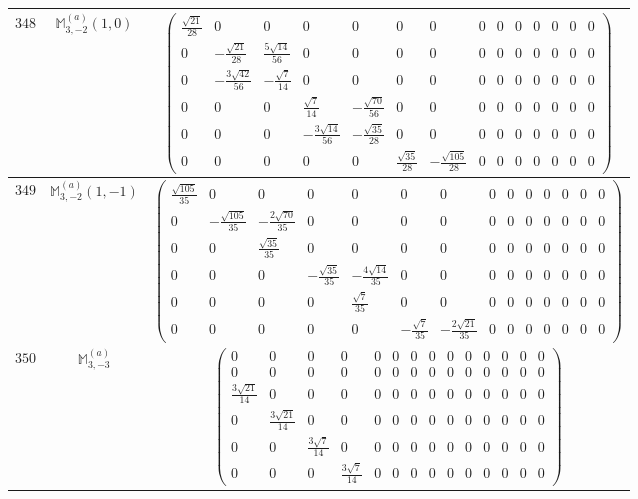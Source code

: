 \documentclass[fleqn,8pt,landscape]{jsarticle}
\begin{document}
\begin{center}
\begin{longtable}{ccc}
$ 348 $ & $ \mathbb{M}_{3,-2}^{(a)}(1,0) $ & $ \begin{pmatrix} \frac{\sqrt{21}}{28} & 0 & 0 & 0 & 0 & 0 & 0 & 0 & 0 & 0 & 0 & 0 & 0 & 0 \\ 0 & - \frac{\sqrt{21}}{28} & \frac{5 \sqrt{14}}{56} & 0 & 0 & 0 & 0 & 0 & 0 & 0 & 0 & 0 & 0 & 0 \\ 0 & - \frac{3 \sqrt{42}}{56} & - \frac{\sqrt{7}}{14} & 0 & 0 & 0 & 0 & 0 & 0 & 0 & 0 & 0 & 0 & 0 \\ 0 & 0 & 0 & \frac{\sqrt{7}}{14} & - \frac{\sqrt{70}}{56} & 0 & 0 & 0 & 0 & 0 & 0 & 0 & 0 & 0 \\ 0 & 0 & 0 & - \frac{3 \sqrt{14}}{56} & - \frac{\sqrt{35}}{28} & 0 & 0 & 0 & 0 & 0 & 0 & 0 & 0 & 0 \\ 0 & 0 & 0 & 0 & 0 & \frac{\sqrt{35}}{28} & - \frac{\sqrt{105}}{28} & 0 & 0 & 0 & 0 & 0 & 0 & 0 \end{pmatrix} $ \\ \hline
$ 349 $ & $ \mathbb{M}_{3,-2}^{(a)}(1,-1) $ & $ \begin{pmatrix} \frac{\sqrt{105}}{35} & 0 & 0 & 0 & 0 & 0 & 0 & 0 & 0 & 0 & 0 & 0 & 0 & 0 \\ 0 & - \frac{\sqrt{105}}{35} & - \frac{2 \sqrt{70}}{35} & 0 & 0 & 0 & 0 & 0 & 0 & 0 & 0 & 0 & 0 & 0 \\ 0 & 0 & \frac{\sqrt{35}}{35} & 0 & 0 & 0 & 0 & 0 & 0 & 0 & 0 & 0 & 0 & 0 \\ 0 & 0 & 0 & - \frac{\sqrt{35}}{35} & - \frac{4 \sqrt{14}}{35} & 0 & 0 & 0 & 0 & 0 & 0 & 0 & 0 & 0 \\ 0 & 0 & 0 & 0 & \frac{\sqrt{7}}{35} & 0 & 0 & 0 & 0 & 0 & 0 & 0 & 0 & 0 \\ 0 & 0 & 0 & 0 & 0 & - \frac{\sqrt{7}}{35} & - \frac{2 \sqrt{21}}{35} & 0 & 0 & 0 & 0 & 0 & 0 & 0 \end{pmatrix} $ \\ \hline
$ 350 $ & $ \mathbb{M}_{3,-3}^{(a)} $ & $ \begin{pmatrix} 0 & 0 & 0 & 0 & 0 & 0 & 0 & 0 & 0 & 0 & 0 & 0 & 0 & 0 \\ 0 & 0 & 0 & 0 & 0 & 0 & 0 & 0 & 0 & 0 & 0 & 0 & 0 & 0 \\ \frac{3 \sqrt{21}}{14} & 0 & 0 & 0 & 0 & 0 & 0 & 0 & 0 & 0 & 0 & 0 & 0 & 0 \\ 0 & \frac{3 \sqrt{21}}{14} & 0 & 0 & 0 & 0 & 0 & 0 & 0 & 0 & 0 & 0 & 0 & 0 \\ 0 & 0 & \frac{3 \sqrt{7}}{14} & 0 & 0 & 0 & 0 & 0 & 0 & 0 & 0 & 0 & 0 & 0 \\ 0 & 0 & 0 & \frac{3 \sqrt{7}}{14} & 0 & 0 & 0 & 0 & 0 & 0 & 0 & 0 & 0 & 0 \end{pmatrix} $ \\ \hline

\end{longtable}
\end{center}
\end{document}
